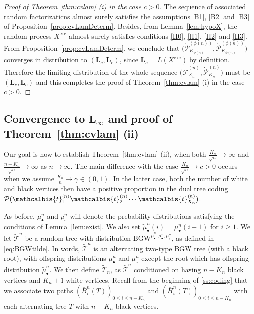 \documentclass[AHL,XML,longabstracts,Unicode]{cedram}
\def\PPP{\mathcal P}
\def\dFKn{\dot{\mathcal{F}}^{(n)}_{K_{n}}}
\def\dPKn{\dot{\mathcal{P}}^{(n)}_{K_{n}}}
\def\dFKphin{\dot{\mathcal{F}}^{(\phi(n))}_{K_{\phi(n)}}}
\def\dPKphin{\dot{\mathcal{F}}^{(\phi(n))}_{K_{\phi(n)}}}
\def\dFKphin{\dot{\mathcal{P}}^{(\phi(n))}_{K_{\phi(n)}}}
\def\dPKphin{\dot{\mathcal{P}}^{(\phi(n))}_{K_{\phi(n)}}}
\def\mubn{\mu_{\bullet}^{n}}
\def\mucn{\mu_{\circ}^{n}}
\def\oB{\overline{B}}
\def\oH{\overline{H}}
\def \Xexc{X^{\mathrm{exc}}}
\def\tTs{\tilde{\Ts}}
\newcommand\BGW{\textrm{BGW}}
\def\tb{\mathcalbis{t}}
\def\Ts{\mathscr{T}}
\begin{document}
\begin{proof}[Proof of Theorem~\ref{thm:cvlam} (i) in the case $c>0$]
  The sequence of associated random factorizations almost surely satisfies the assumptions
  \ref{B1}, \ref{B2} and \ref{B3} of Proposition~\ref{prop:cvLamDeterm}.
  Besides, from Lemma~\ref{lem:hypoX}, the random process $\Xexc$ almost surely
  satisfies conditions \ref{H0}, \ref{H1}, \ref{H2} and \ref{H3}.
  From Proposition~\ref{prop:cvLamDeterm},
   we conclude that $\big( \dFKphin  ,  \dPKphin \big)$ converges in distribution
   to $(\mathbf{L}_c,\mathbf{L}_c)$, since $\mathbf{L}_c=L(\Xexc)$ by definition.
  Therefore the limiting distribution of the whole sequence $\big( \dFKn, \dPKn\big)$
  must be $(\mathbf{L}_c,\mathbf{L}_c)$ and this completes the proof of Theorem~\ref{thm:cvlam} (i) in the case $c>0$.
\end{proof}


\subsection{Convergence to \texorpdfstring{$\mathbf{L}_{\infty}$}{L infinity} and proof of Theorem~\ref{thm:cvlam} (ii)}
\label{sec:Linfty}

Our goal is now to establish Theorem~\ref{thm:cvlam} (ii), when  both $\frac{K_{n}}{\sqrt{n}} \rightarrow \infty$ and  $ \frac{n-K_{n}}{\sqrt{n}} \rightarrow \infty$ as $n \rightarrow \infty$.
The main difference  with the case $ \frac{K_{n}}{\sqrt{n}}  \rightarrow c>0$ occurs when we assume $ \tfrac{K_{n}}{n} \rightarrow \gamma \in (0,1)$.
In the latter case,  both the  number of white and black vertices then have a positive proportion in the dual tree coding $ \PPP(\tb_{1}^{(n)}\tb_{2}^{(n)} \cdots \tb_{K_{n}}^{(n)}) $.


As before, $\mubn$ and $\mucn$  will denote the probability distributions satisfying the conditions of Lemma~\ref{lem:exist}.
We also set $\widetilde{\mu}^{n}_{\bullet}(i)=\mubn(i-1)$ for $i \geq 1$.
We let $\tilde{\Ts}^{n}$ be a random tree with distribution ${\BGW}^{\widetilde{\mu}_{\bullet}^{n},\mubn,\mucn}$, as defined in \eqref{eq:BGWtilde}.
In words, $\tilde{\Ts}^{n}$ is
 an alternating two-type BGW tree (with a black root), with offspring distributions $\mubn$ and $\mucn$ except the root which has offspring distribution $\widetilde{\mu}^{n}_{\bullet}$.
We then define $\tTs_n$, as $\tTs^{n}$ conditioned on having $n-K_{n}$ black vertices and $K_{n}+1$ white vertices.
Recall from the beginning of \cref{ss:coding} that we associate
two paths $(\oB^{n}_{i}(T))_{0 \leq i \leq n-K_{n}}$ and  $(\oH^{n}_{i}(T))_{0 \leq i \leq n-K_{n}}$ with each alternating tree $T$
with $n-K_n$ black vertices.
\end{document}
